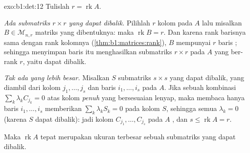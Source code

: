\begin{solution}{exo:b1:det:12}
Tulislah $r = \operatorname{rk} A$.

\emph{Ada submatriks $r \times r$ yang dapat dibalik.} Pilihlah $r$
kolom  pada $A$ lalu misalkan $B \in \mathcal{M}_{n,r}$
matriks yang dibentuknya: maka $\operatorname{rk} B = r$. Dan karena rank barisnya
sama dengan rank kolomnya (\cref{thm:b1:matrices:rank}), $B$ mempunyai $r$
baris ; sehingga menyimpan baris itu menghasilkan submatriks $r \times r$
pada $A$ yang ber-rank $r$, yaitu dapat dibalik.

\emph{Tak ada yang lebih besar.} Misalkan $S$ submatriks $s \times s$
yang dapat dibalik, yang diambil dari kolom $j_1, \dots, j_s$ dan baris $i_1,
\dots, i_s$ pada $A$. Jika sebuah kombinasi $\sum_k \lambda_k
C_{j_k} = 0$ atas kolom \emph{penuh} yang bersesuaian lenyap,
maka membaca hanya baris $i_1, \dots, i_s$ memberikan $\sum_k
\lambda_k S_k = 0$ pada kolom $S$, sehingga semua $\lambda_k = 0$
(karena $S$ dapat dibalik): jadi kolom $C_{j_1}, \dots, C_{j_s}$ pada $A$
, dan $s \leq \operatorname{rk} A = r$.

Maka $\operatorname{rk} A$ tepat merupakan ukuran terbesar sebuah
submatriks yang dapat dibalik.
\end{solution}

